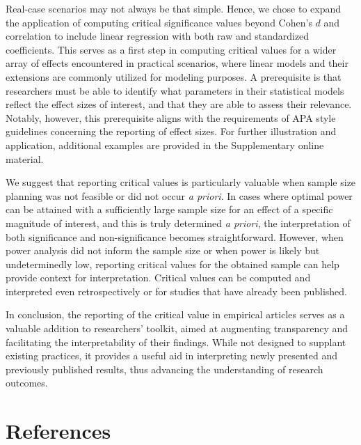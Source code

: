 \documentclass[
  man]{apa7}
\begin{document}
Real-case scenarios may not always be that simple. Hence, we chose to expand the application of computing critical significance values beyond Cohen's \(d\) and correlation to include linear regression with both raw and standardized coefficients. This serves as a first step in computing critical values for a wider array of effects encountered in practical scenarios, where linear models and their extensions are commonly utilized for modeling purposes. A prerequisite is that researchers must be able to identify what parameters in their statistical models reflect the effect sizes of interest, and that they are able to assess their relevance. Notably, however, this prerequisite aligns with the requirements of APA style guidelines concerning the reporting of effect sizes. For further illustration and application, additional examples are provided in the Supplementary online material.

We suggest that reporting critical values is particularly valuable when sample size planning was not feasible or did not occur \textit{a priori}. In cases where optimal power can be attained with a sufficiently large sample size for an effect of a specific magnitude of interest, and this is truly determined \textit{a priori}, the interpretation of both significance and non-significance becomes straightforward. However, when power analysis did not inform the sample size or when power is likely but undeterminedly low, reporting critical values for the obtained sample can help provide context for interpretation. Critical values can be computed and interpreted even retrospectively or for studies that have already been published.

In conclusion, the reporting of the critical value in empirical articles serves as a valuable addition to researchers' toolkit, aimed at augmenting transparency and facilitating the interpretability of their findings. While not designed to supplant existing practices, it provides a useful aid in interpreting newly presented and previously published results, thus advancing the understanding of research outcomes.

\newpage

\hypertarget{references}{%
\section{References}\label{references}}
\end{document}
